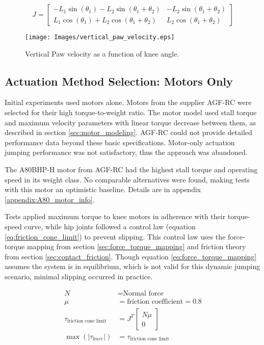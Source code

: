 \begin{equation}
    \label{eq:jacobian_vertical_jump_leg}
    J = \begin{bmatrix} 
    -L_1 \sin(\theta_1) - L_2 \sin(\theta_1 + \theta_2) & -L_2 \sin(\theta_1 + \theta_2) \\
    L_1 \cos(\theta_1) + L_2 \cos(\theta_1 + \theta_2) & L_2 \cos(\theta_1 + \theta_2)
    \end{bmatrix}
\end{equation}

\begin{figure}[h]
    \centering
    \texttt{[image: Images/vertical\_paw\_velocity.eps]}
    \caption{Vertical Paw velocity as a function of knee angle.}
    \label{fig:vertical_jacobian_velocity}
\end{figure}

\subsection{Actuation Method Selection: Motors Only}
\label{sec:design_motor_only_jumps}

Initial experiments used motors alone. Motors from the supplier AGF-RC were selected for their high torque-to-weight ratio. The motor model used stall torque and maximum velocity parameters with linear torque decrease between them, as described in section \ref{sec:motor_modeling}. AGF-RC could not provide detailed performance data beyond these basic specifications. Motor-only actuation jumping performance was not satisfactory, thus the approach was abandoned. 

The A80BHP-H motor from AGF-RC had the highest stall torque and operating speed in its weight class. No comparable alternatives were found, making tests with this motor an optimistic baseline. Details are in appendix \ref{appendix:A80_motor_info}.

Tests applied maximum torque to knee motors in adherence with their torque-speed curve, while hip joints followed a control law (equation \ref{eq:friction_cone_limit}) to prevent slipping. This control law uses the force-torque mapping from section \ref{sec:force_torque_mapping} and friction theory from section \ref{sec:contact_friction}. Though equation \ref{eq:force_torque_mapping} assumes the system is in equilibrium, which is not valid for this dynamic jumping scenario, minimal slipping occurred in practice.

\begin{align}
    N &= \text{Normal force} \\
    \mu &= \text{friction coefficient} = 0.8 \\
    \tau_{\text{friction cone limit}} &= J^T 
    \begin{bmatrix}
        N \mu \\
        0
    \end{bmatrix} \\
    \max(|\tau_{knee}|) &= \tau_{\text{friction cone limit}}
    \label{eq:friction_cone_limit}
\end{align}

